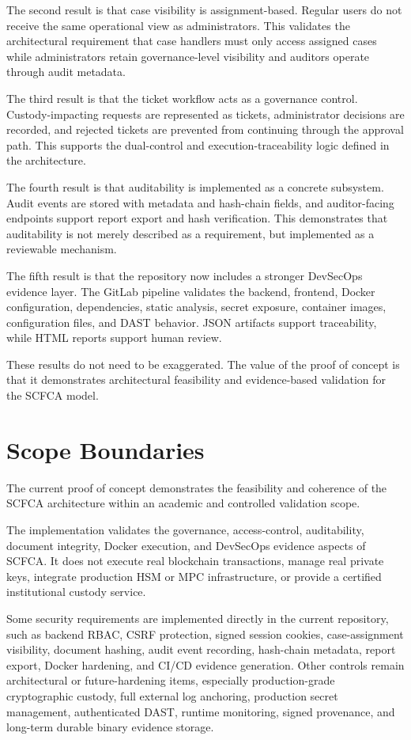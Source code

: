 \documentclass[12pt,a4paper]{report}
\begin{document}
The second result is that case visibility is assignment-based. Regular users do not receive the same operational view as administrators. This validates the architectural requirement that case handlers must only access assigned cases while administrators retain governance-level visibility and auditors operate through audit metadata.

The third result is that the ticket workflow acts as a governance control. Custody-impacting requests are represented as tickets, administrator decisions are recorded, and rejected tickets are prevented from continuing through the approval path. This supports the dual-control and execution-traceability logic defined in the architecture.

The fourth result is that auditability is implemented as a concrete subsystem. Audit events are stored with metadata and hash-chain fields, and auditor-facing endpoints support report export and hash verification. This demonstrates that auditability is not merely described as a requirement, but implemented as a reviewable mechanism.

The fifth result is that the repository now includes a stronger DevSecOps evidence layer. The GitLab pipeline validates the backend, frontend, Docker configuration, dependencies, static analysis, secret exposure, container images, configuration files, and DAST behavior. JSON artifacts support traceability, while HTML reports support human review.

These results do not need to be exaggerated. The value of the proof of concept is that it demonstrates architectural feasibility and evidence-based validation for the SCFCA model.

\section{Scope Boundaries}

The current proof of concept demonstrates the feasibility and coherence of the SCFCA architecture within an academic and controlled validation scope.

The implementation validates the governance, access-control, auditability, document integrity, Docker execution, and DevSecOps evidence aspects of SCFCA. It does not execute real blockchain transactions, manage real private keys, integrate production HSM or MPC infrastructure, or provide a certified institutional custody service.

Some security requirements are implemented directly in the current repository, such as backend RBAC, CSRF protection, signed session cookies, case-assignment visibility, document hashing, audit event recording, hash-chain metadata, report export, Docker hardening, and CI/CD evidence generation. Other controls remain architectural or future-hardening items, especially production-grade cryptographic custody, full external log anchoring, production secret management, authenticated DAST, runtime monitoring, signed provenance, and long-term durable binary evidence storage.
\end{document}
